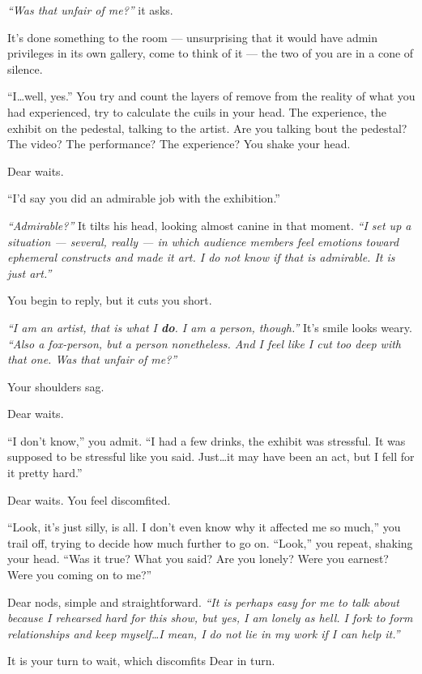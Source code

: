 \emph{``Was that unfair of me?''} it asks.

It's done something to the room --- unsurprising that it would have admin privileges in its own gallery, come to think of it --- the two of you are in a cone of silence.

``I\ldots{}well, yes.'' You try and count the layers of remove from the reality of what you had experienced, try to calculate the cuils in your head. The experience, the exhibit on the pedestal, talking to the artist. Are you talking bout the pedestal? The video? The performance? The experience? You shake your head.

Dear waits.

``I'd say you did an admirable job with the exhibition.''

\emph{``Admirable?''} It tilts his head, looking almost canine in that moment. \emph{``I set up a situation --- several, really --- in which audience members feel emotions toward ephemeral constructs and made it art. I do not know if that is admirable. It is just art.''}

You begin to reply, but it cuts you short.

\emph{``I am an artist, that is what I \textbf{do}. I am a person, though.''} It's smile looks weary. \emph{``Also a fox-person, but a person nonetheless. And I feel like I cut too deep with that one. Was that unfair of me?''}

Your shoulders sag.

Dear waits.

``I don't know,'' you admit. ``I had a few drinks, the exhibit was stressful. It was supposed to be stressful like you said. Just\ldots{}it may have been an act, but I fell for it pretty hard.''

Dear waits. You feel discomfited.

``Look, it's just silly, is all. I don't even know why it affected me so much,'' you trail off, trying to decide how much further to go on. ``Look,'' you repeat, shaking your head. ``Was it true? What you said? Are you lonely? Were you earnest? Were you coming on to me?''

Dear nods, simple and straightforward. \emph{``It is perhaps easy for me to talk about because I rehearsed hard for this show, but yes, I am lonely as hell. I fork to form relationships and keep myself\ldots{}I mean, I do not lie in my work if I can help it.''}

It is your turn to wait, which discomfits Dear in turn.

